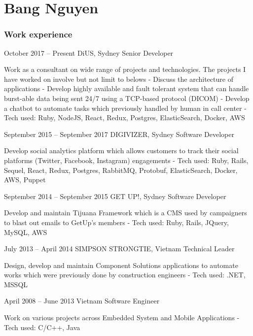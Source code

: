 \documentclass{tccv}
\begin{document}
\part{Bang Nguyen}

\section{Work experience}

\begin{eventlist}

\item{October 2017 -- Present}
    {DiUS, Sydney}
    {Senior Developer}

    Work as a consultant on wide range of projects and technologies. The projects
    I have worked on involve but not limit to belows
    \newline- Discuss the architecture of applications
    \newline- Develop highly available and fault tolerant system that can handle
    burst-able data being sent 24/7 using a TCP-based protocol (DICOM)
    \newline- Develop a chatbot to automate tasks which previously handled by
    human in call center
    \newline- Tech used: Ruby, NodeJS, React, Redux, Postgres, ElasticSearch,
    Docker, AWS

\item{September 2015 -- September 2017}
    {DIGIVIZER, Sydney}
    {Software Developer}

    Develop social analytics platform which allows customers to track their
    social platforms (Twitter, Facebook, Instagram) engagements
    \newline- Tech used: Ruby, Rails, Sequel, React, Redux, Postgres, RabbitMQ,
    Protobuf, ElasticSearch, Docker, AWS, Puppet

\item{September 2014 -- September 2015}
    {GET UP!, Sydney}
    {Software Developer}

    Develop and maintain Tijuana Framework which is a CMS
    used by campaigners to blast out emails to GetUp's members
    \newline- Tech used: Ruby, Rails, JQuery, MySQL, AWS

\item{July 2013 -- April 2014}
    {SIMPSON STRONGTIE, Vietnam}
    {Technical Leader}

    Design, develop and maintain Component Solutions applications to automate
    works which were previously done by construction engineers
    \newline- Tech used: .NET, MSSQL

\item{April 2008 -- June 2013}
    {Vietnam}
    {Software Engineer}

    Work on various projects across Embedded System and Mobile Applications
    \newline- Tech used: C/C++, Java

\end{eventlist}
\end{document}
